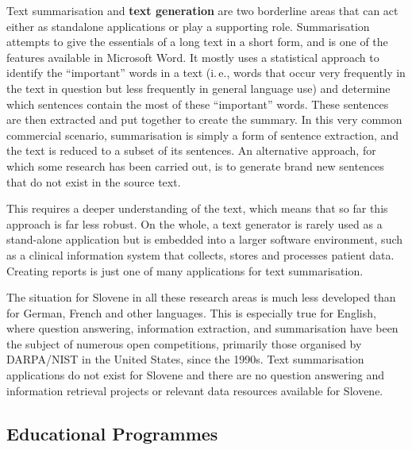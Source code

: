 \begin{multicols}{2}
    Text summarisation and \textbf{text generation} are two borderline areas that can act either as standalone applications or play a supporting role. Summarisation attempts to give the essentials of a long text in a short form, and is one of the features available in Microsoft Word. It mostly uses a statistical approach to identify the “important” words in a text (i.\,e., words that occur very frequently in the text in question but less frequently in general language use) and determine which sentences contain the most of these “important” words. These sentences are then extracted and put together to create the summary. In this very common commercial scenario, summarisation is simply a form of sentence extraction, and the text is reduced to a subset of its sentences. An alternative approach, for which some research has been carried out, is to generate brand new sentences that do not exist in the source text. 


This requires a deeper understanding of the text, which means that so far this approach is far less robust. On the whole, a text generator is rarely used as a stand-alone application but is embedded into a larger software environment, such as a clinical information system that collects, stores and processes patient data. Creating reports is just one of many applications for text summarisation. 

The situation for Slovene in all these research areas is much less developed than for German, French and other languages. This is especially true for English, where question answering, information extraction, and summarisation have been the subject of numerous open competitions, primarily those organised by DARPA/NIST in the United States, since the 1990s. Text summarisation applications do not exist for Slovene and there are no question answering and information retrieval projects or relevant data resources available for Slovene.

\subsection{Educational Programmes}


\end{multicols}
